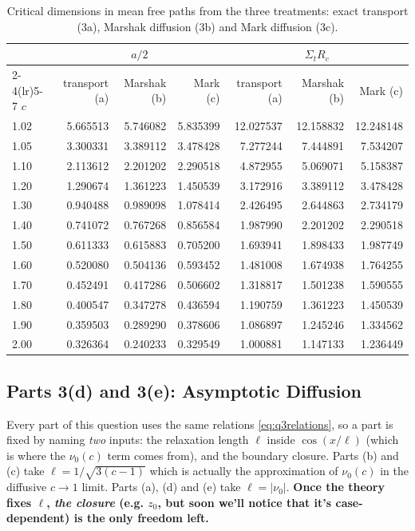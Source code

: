 \documentclass[11pt]{article}
\begin{document}
\begin{table}[hbt!]
    \centering
    \begin{tabular}{lrrrrrr}
        \toprule
        & \multicolumn{3}{c}{$a/2$} & \multicolumn{3}{c}{$\Sigma_t R_c$} \\
        \cmidrule(lr){2-4}\cmidrule(lr){5-7}
        $c$ & transport (a) & Marshak (b) & Mark (c) & transport (a) & Marshak (b) & Mark (c) \\
        \midrule
        1.02 & 5.665513 & 5.746082 & 5.835399 & 12.027537 & 12.158832 & 12.248148 \\
        1.05 & 3.300331 & 3.389112 & 3.478428 & 7.277244 & 7.444891 & 7.534207 \\
        1.10 & 2.113612 & 2.201202 & 2.290518 & 4.872955 & 5.069071 & 5.158387 \\
        1.20 & 1.290674 & 1.361223 & 1.450539 & 3.172916 & 3.389112 & 3.478428 \\
        1.30 & 0.940488 & 0.989098 & 1.078414 & 2.426495 & 2.644863 & 2.734179 \\
        1.40 & 0.741072 & 0.767268 & 0.856584 & 1.987990 & 2.201202 & 2.290518 \\
        1.50 & 0.611333 & 0.615883 & 0.705200 & 1.693941 & 1.898433 & 1.987749 \\
        1.60 & 0.520080 & 0.504136 & 0.593452 & 1.481008 & 1.674938 & 1.764255 \\
        1.70 & 0.452491 & 0.417286 & 0.506602 & 1.318817 & 1.501238 & 1.590555 \\
        1.80 & 0.400547 & 0.347278 & 0.436594 & 1.190759 & 1.361223 & 1.450539 \\
        1.90 & 0.359503 & 0.289290 & 0.378606 & 1.086897 & 1.245246 & 1.334562 \\
        2.00 & 0.326364 & 0.240233 & 0.329549 & 1.000881 & 1.147133 & 1.236449 \\
        \bottomrule
    \end{tabular}
    \caption{Critical dimensions in mean free paths from the three treatments: exact transport (3a), Marshak diffusion (3b) and Mark diffusion (3c).}
    \label{tab:q3bc}
\end{table}

\subsection*{Parts 3(d) and 3(e): Asymptotic Diffusion}
Every part of this question uses the same relations \eqref{eq:q3relations}, so a part is fixed
by naming \emph{two} inputs: the relaxation length $\ell$ inside $\cos(x/\ell)$ (which is where the $\nu_0(c)$ term comes from), and
the boundary closure. Parts (b) and (c) take $\ell = 1/\sqrt{3(c-1)}$ which is actually the approximation of $\nu_0(c)$ in the diffusive $c\to 1$ limit. Parts (a), (d) and (e)
take $\ell = |\nu_0|$. \textbf{Once the theory fixes $\ell$, \textit{the closure} (e.g. $z_0$, but soon we'll notice that it's case-dependent) is the only freedom left.}
\end{document}
